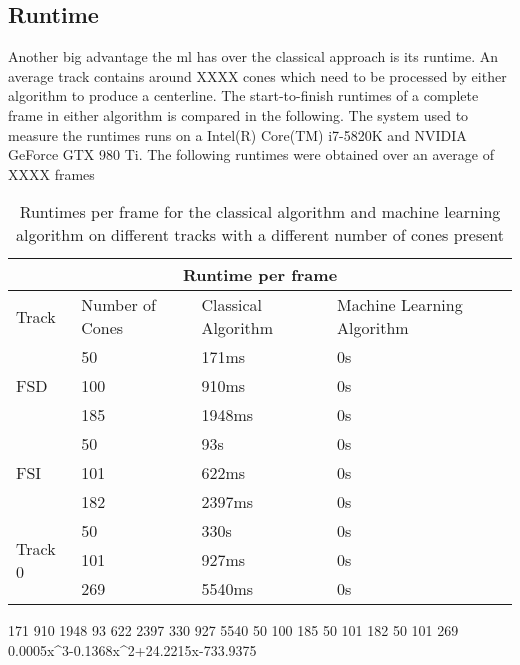 \subsection{Runtime}
Another big advantage the \ac{ml} has over the classical approach is its runtime. An average track contains around XXXX cones which need to be processed by either algorithm to produce a centerline. The start-to-finish runtimes of a complete frame in either algorithm is compared in the following. The system used to measure the runtimes runs on a Intel(R) Core(TM) i7-5820K and NVIDIA GeForce GTX 980 Ti. The following runtimes were obtained over an average of XXXX frames

\begin{table}[h!]
\centering
\begin{tabular}{ |p{1.5cm} p{3cm}||p{4cm}|p{5cm}|  }
    \hline
    \multicolumn{4}{|c|}{Runtime per frame} \\
    \hline
    Track  & Number of Cones  & Classical Algorithm & Machine Learning Algorithm\\
    \hline
    \hline

    \multirow{3}{*}{FSD} & 50  & 171ms & 0s \\
                         & 100 & 910ms & 0s\\
                         & 185 & 1948ms & 0s\\ 
                         \hline
    \multirow{3}{*}{FSI} & 50  & 93s & 0s\\
                         & 101 & 622ms & 0s\\
                         & 182 & 2397ms & 0s\\ 
                         \hline
    \multirow{3}{*}{Track 0} & 50  & 330s & 0s\\
                             & 101 & 927ms & 0s\\
                             & 269 & 5540ms & 0s \\ 
                             \hline
   \end{tabular}
\caption{Runtimes per frame for the classical algorithm and machine learning algorithm on different tracks with a different number of cones present}
\label{table:2}
\end{table}
171 910 1948 93 622 2397 330 927 5540
50 100 185 50 101 182 50 101 269
0.0005x^3-0.1368x^2+24.2215x-733.9375